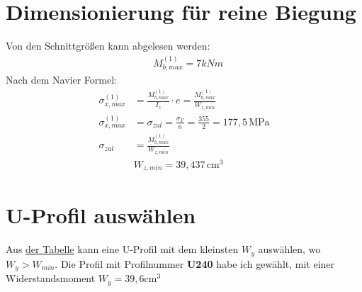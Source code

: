\section{Dimensionierung für reine Biegung}
Von den Schnittgrößen kann abgelesen werden:
\begin{align*}
  &M_{b,max}^{(1)} = 7kNm
\end{align*}
Nach dem Navier Formel:
\begin{align*}
  \sigma_{x,max}^{(1)} &= \frac{M_{b,max}^{(1)}}{I_z} \cdot e = \frac{M_{b,max}^{(1)}}{W_{z,min}} \\
  \sigma_{x,max}^{(1)} &= \sigma_{zul} = \frac{\sigma_F}{n} = \frac{355}{2} = 177,5 \, \text{MPa} \\
  \sigma_{zul} &= \frac{{M_{b,max}^{(1)}}}{W_{z,min}} \\
  &\boxed{
    W_{z,min} = 39,437 \, \text{cm}^3
  }
\end{align*}

\section{U-Profil auswählen}
Aus \href{https://www.mm.bme.hu/edu/bsc/de/tm2/DIN-1026-1-U-Profile.pdf}{der Tabelle} kann eine U-Profil mit dem kleinsten $W_y$ auswählen, wo $W_y > W_{min}$.
Die Profil mit Profilnummer \textbf{U240} habe ich gewählt, mit einer Widerstandsmoment $W_y = 39,6 \text{cm}^3$

